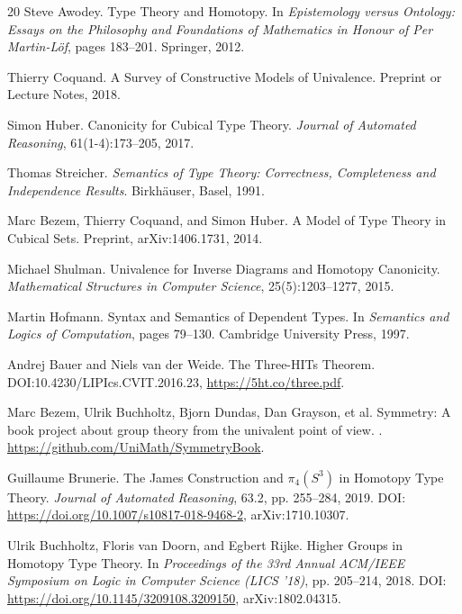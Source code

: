 \documentclass[a4paper,UKenglish,cleveref, autoref, thm-restate]{lipics-v2021}
\begin{document}
\begin{thebibliography}{20}
Steve Awodey.
\newblock Type Theory and Homotopy.
\newblock In \emph{Epistemology versus Ontology: Essays on the Philosophy and Foundations of Mathematics in Honour of Per Martin-Löf}, pages 183--201. Springer, 2012.

Thierry Coquand.
\newblock A Survey of Constructive Models of Univalence.
\newblock Preprint or Lecture Notes, 2018.

Simon Huber.
\newblock Canonicity for Cubical Type Theory.
\newblock \emph{Journal of Automated Reasoning}, 61(1-4):173--205, 2017.

Thomas Streicher.
\newblock \emph{Semantics of Type Theory: Correctness, Completeness and Independence Results}.
\newblock Birkhäuser, Basel, 1991.

Marc Bezem, Thierry Coquand, and Simon Huber.
\newblock A Model of Type Theory in Cubical Sets.
\newblock Preprint, arXiv:1406.1731, 2014.

Michael Shulman.
\newblock Univalence for Inverse Diagrams and Homotopy Canonicity.
\newblock \emph{Mathematical Structures in Computer Science}, 25(5):1203--1277, 2015.

Martin Hofmann.
\newblock Syntax and Semantics of Dependent Types.
\newblock In \emph{Semantics and Logics of Computation}, pages 79--130. Cambridge University Press, 1997.

Andrej Bauer and Niels van der Weide.
\newblock The Three-HITs Theorem.
\newblock DOI:10.4230/LIPIcs.CVIT.2016.23, \url{https://5ht.co/three.pdf}.


Marc Bezem, Ulrik Buchholtz, Bjorn Dundas, Dan Grayson, et al.
\newblock Symmetry: A book project about group theory from the univalent point of view.
. \url{https://github.com/UniMath/SymmetryBook}.

Guillaume Brunerie.
\newblock The James Construction and $\pi_4(S^3)$ in Homotopy Type Theory.
\newblock \emph{Journal of Automated Reasoning}, 63.2, pp. 255--284, 2019.
\newblock DOI: \url{https://doi.org/10.1007/s10817-018-9468-2}, arXiv:1710.10307.

Ulrik Buchholtz, Floris van Doorn, and Egbert Rijke.
\newblock Higher Groups in Homotopy Type Theory.
\newblock In \emph{Proceedings of the 33rd Annual ACM/IEEE Symposium on Logic in Computer Science (LICS '18)}, pp. 205--214, 2018.
\newblock DOI: \url{https://doi.org/10.1145/3209108.3209150}, arXiv:1802.04315.


\end{thebibliography}
\end{document}
